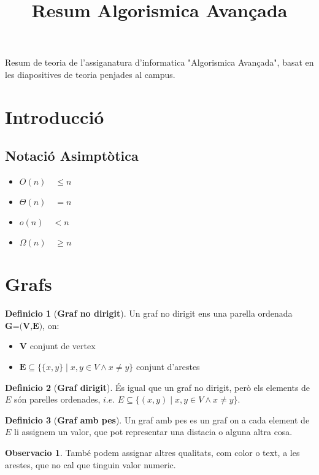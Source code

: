 \documentclass[12pt]{article}
\title{Resum Algorismica Avançada}
\theoremstyle{definition}
\newtheorem{definicio}{Definicio}
\theoremstyle{definition}
\theoremstyle{definition}
\newtheorem{obs}{Observacio}
\theoremstyle{definition}
\theoremstyle{definition}
\theoremstyle{definition}
\theoremstyle{definition}
\begin{document}
Resum de teoria de l'assiganatura d'informatica "Algorismica Avançada", basat en les diapositives de teoria penjades al campus.

\section{Introducció}

\subsection{Notació Asimptòtica}

\begin{itemize}
	\item $O(n)\quad \leq n$
	\item $\Theta (n) \quad =n$
	\item $o(n)\quad <n$
	\item $\Omega(n)\quad \geq n$
\end{itemize}

\section{Grafs}

\begin{definicio}[\textbf{Graf no dirigit}]
Un graf no dirigit ens una parella ordenada $\textbf{G=(V,E)}$, on:
\begin{itemize}
	\item $\textbf{V}$ conjunt de vertex
	\item $\textbf{E}\subseteq \{\{x,y\}\mid x,y\in V \wedge x\neq y\}$ conjunt d'arestes
\end{itemize}
\end{definicio}

\begin{definicio}[\textbf{Graf dirigit}]
És igual que un graf no dirigit, però els elements de $E$ són parelles ordenades, $i.e.$ $E\subseteq \{(x,y)\mid x,y\in V \wedge x\neq y\}$.
\end{definicio}

\begin{definicio}[\textbf{Graf amb pes}]
Un graf amb pes es un graf on a cada element de $E$ li assignem un valor, que pot representar una distacia o alguna altra cosa.
\end{definicio}

\begin{obs}
També podem assignar altres qualitats, com color o text, a les arestes, que no cal que tinguin valor numeric.
\end{obs}
\end{document}
